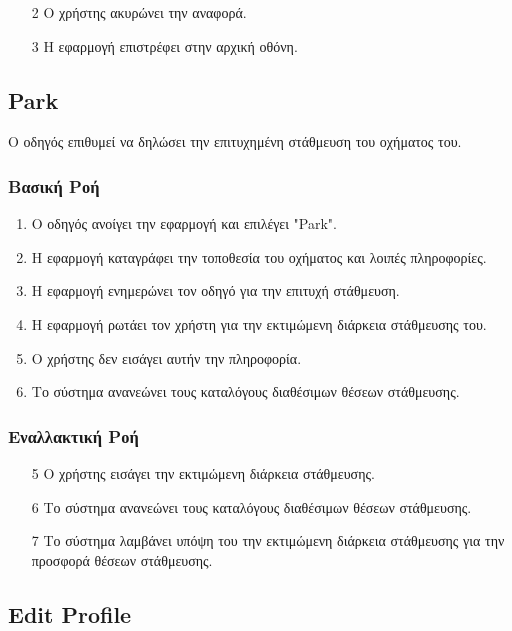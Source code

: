 \documentclass[11pt]{article}
\begin{document}
\begin{enumerate}
    \item[2] Ο χρήστης ακυρώνει την αναφορά.
    \item[3] Η εφαρμογή επιστρέφει στην αρχική οθόνη.
\end{enumerate}

\subsection{Park}

Ο οδηγός επιθυμεί να δηλώσει την επιτυχημένη στάθμευση του οχήματος του.

\subsubsection{Βασική Ροή}

\begin{enumerate}
    \item O οδηγός ανοίγει την εφαρμογή και επιλέγει "Park".
    \item Η εφαρμογή καταγράφει την τοποθεσία του οχήματος και λοιπές πληροφορίες.
    \item Η εφαρμογή ενημερώνει τον οδηγό για την επιτυχή στάθμευση.
    \item Η εφαρμογή ρωτάει τον χρήστη για την εκτιμώμενη διάρκεια στάθμευσης του.
    \item Ο χρήστης δεν εισάγει αυτήν την πληροφορία.
    \item Το σύστημα ανανεώνει τους καταλόγους διαθέσιμων θέσεων στάθμευσης.
\end{enumerate}

\subsubsection{Εναλλακτική Ροή}

\begin{enumerate}
    \item[5] Ο χρήστης εισάγει την εκτιμώμενη διάρκεια στάθμευσης.
    \item[6] Το σύστημα ανανεώνει τους καταλόγους διαθέσιμων θέσεων στάθμευσης.
    \item[7] Το σύστημα λαμβάνει υπόψη του την εκτιμώμενη διάρκεια στάθμευσης
        για την προσφορά θέσεων στάθμευσης.
\end{enumerate}

\subsection{Edit Profile}
\end{document}
